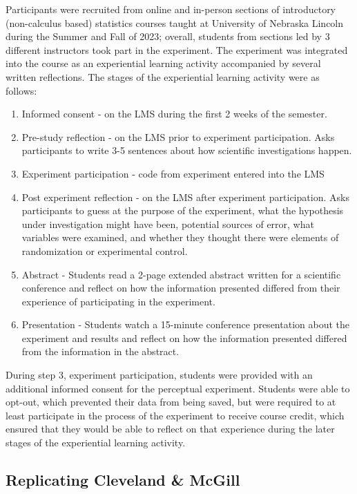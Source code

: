 \documentclass[runningheads
]{llncs}
\providecommand{\tightlist}{%
  \setlength{\itemsep}{0pt}\setlength{\parskip}{0pt}}\usepackage{longtable,booktabs,array}
\begin{document}
Participants were recruited from online and in-person sections of
introductory (non-calculus based) statistics courses taught at
University of Nebraska Lincoln during the Summer and Fall of 2023;
overall, students from sections led by 3 different instructors took part
in the experiment. The experiment was integrated into the course as an
experiential learning activity accompanied by several written
reflections. The stages of the experiential learning activity were as
follows:

\begin{enumerate}
\def\labelenumi{\arabic{enumi}.}
\tightlist
\item
  Informed consent - on the LMS during the first 2 weeks of the
  semester.
\item
  Pre-study reflection - on the LMS prior to experiment participation.
  Asks participants to write 3-5 sentences about how scientific
  investigations happen.
\item
  Experiment participation - code from experiment entered into the LMS
\item
  Post experiment reflection - on the LMS after experiment
  participation. Asks participants to guess at the purpose of the
  experiment, what the hypothesis under investigation might have been,
  potential sources of error, what variables were examined, and whether
  they thought there were elements of randomization or experimental
  control.
\item
  Abstract - Students read a 2-page extended abstract written for a
  scientific conference and reflect on how the information presented
  differed from their experience of participating in the experiment.
\item
  Presentation - Students watch a 15-minute conference presentation
  about the experiment and results and reflect on how the information
  presented differed from the information in the abstract.
\end{enumerate}

During step 3, experiment participation, students were provided with an
additional informed consent for the perceptual experiment. Students were
able to opt-out, which prevented their data from being saved, but were
required to at least participate in the process of the experiment to
receive course credit, which ensured that they would be able to reflect
on that experience during the later stages of the experiential learning
activity.

\subsection{Replicating Cleveland \&
McGill}\label{replicating-cleveland-mcgill}
\end{document}
